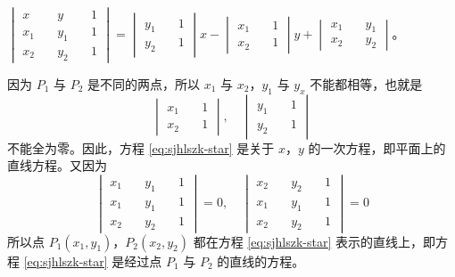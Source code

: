 \zhengming $
    \begin{vmatrix*}
        x   \quad & y   \quad & 1 \\
        x_1 \quad & y_1 \quad & 1 \\
        x_2 \quad & y_2 \quad & 1
    \end{vmatrix*}
    =   \begin{vmatrix*}
            y_1 \quad & 1 \\
            y_2 \quad & 1
        \end{vmatrix*} x
      - \begin{vmatrix*}
            x_1 \quad & 1 \\
            x_2 \quad & 1
        \end{vmatrix*} y
      + \begin{vmatrix*}
            x_1 \quad & y_1 \\
            x_2 \quad & y_2
        \end{vmatrix*}
$。

因为 $P_1$ 与 $P_2$ 是不同的两点，所以 $x_1$ 与 $x_2$，$y_1$ 与 $y_x$ 不能都相等，也就是
$$
\begin{vmatrix*}
    x_1 \quad & 1 \\
    x_2 \quad & 1
\end{vmatrix*}, \quad
\begin{vmatrix*}
    y_1 \quad & 1 \\
    y_2 \quad & 1
\end{vmatrix*}
$$
不能全为零。因此，方程 \eqref{eq:sjhlszk-star} 是关于 $x$，$y$ 的一次方程，即平面上的直线方程。又因为
$$
\begin{vmatrix*}
    x_1 \quad & y_1 \quad & 1 \\
    x_1 \quad & y_1 \quad & 1 \\
    x_2 \quad & y_2 \quad & 1
\end{vmatrix*} = 0,\quad
\begin{vmatrix*}
    x_2 \quad & y_2 \quad & 1 \\
    x_1 \quad & y_1 \quad & 1 \\
    x_2 \quad & y_2 \quad & 1
\end{vmatrix*} = 0
$$
所以点 $P_1(x_1, y_1)$，$P_2(x_2, y_2)$ 都在方程 \eqref{eq:sjhlszk-star}
表示的直线上，即方程 \eqref{eq:sjhlszk-star} 是经过点 $P_1$ 与 $P_2$ 的直线的方程。



